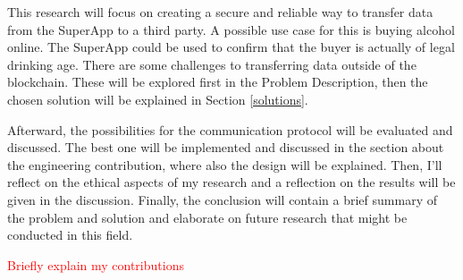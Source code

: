 This research will focus on creating a secure and reliable way to transfer data from the SuperApp to a third party. A possible use case for this is buying alcohol online. The SuperApp could be used to confirm that the buyer is actually of legal drinking age. There are some challenges to transferring data outside of the blockchain. These will be explored first in the Problem Description, then the chosen solution will be explained in Section \ref{solutions}.

Afterward, the possibilities for the communication protocol will be evaluated and discussed. The best one will be implemented and discussed in the section about the engineering contribution, where also the design will be explained. Then, I'll reflect on the ethical aspects of my research and a reflection on the results will be given in the discussion. Finally, the conclusion will contain a brief summary of the problem and solution and elaborate on future research that might be conducted in this field.

\textcolor{red}{Briefly explain my contributions}
